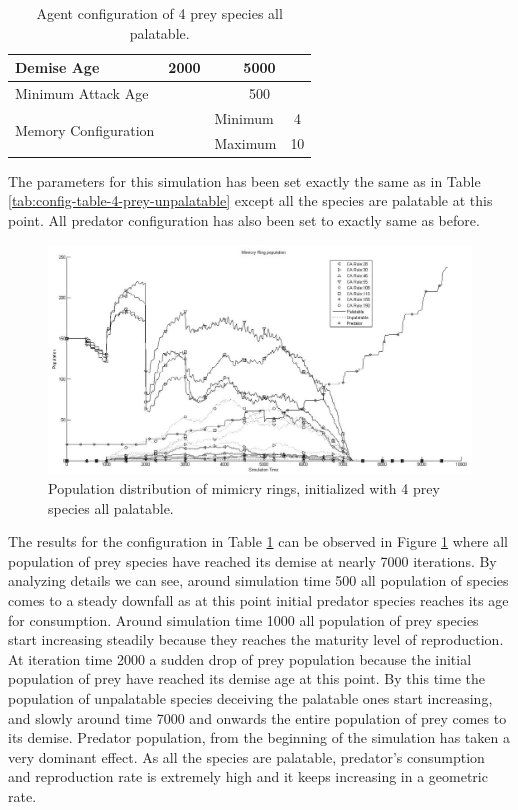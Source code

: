 \begin{table}[H]
\begin{tabular}{|l|l|c|c|l|c|}
  Demise Age	 									 & \multicolumn{3}{|c|}{2000}							& \multicolumn{2}{|c|}{5000} \\ \hline
  Minimum Attack Age						 & \multicolumn{3}{|c|}{} 						    & \multicolumn{2}{|c|}{500} \\ \hline
  \multirow{2}{*}{Memory Configuration} & \multicolumn{3}{|c|}{} 					& Minimum & 4 \\ \cline{5-6}
   																			& \multicolumn{3}{|c|}{} 					& Maximum & 10 \\ \hline  
\end{tabular}
\caption{Agent configuration of 4 prey species all palatable.}
\label{tab:config-table-4-prey-palatable}
\end{table}

The parameters for this simulation has been set exactly the same as in Table \ref{tab:config-table-4-prey-unpalatable} except all the species are palatable at this point. All predator configuration has also been set to exactly same as before.

\begin{figure}[H]
	\centering
	\includegraphics[scale=0.40]{images/simTime-9k-4Prey-p}
	\caption{Population distribution of mimicry rings, initialized with 4 prey species all palatable.}
	\label{fig:plot-4-prey-p}
\end{figure}

The results for the configuration in Table \ref{tab:config-table-4-prey-palatable} can be observed in Figure \ref{fig:plot-4-prey-p} where all population of prey species have reached its demise at nearly 7000 iterations. By analyzing details we can see, around simulation time 500 all population of species comes to a steady downfall as at this point initial predator species reaches its age for consumption. Around simulation time 1000 all population of prey species start increasing steadily because they reaches the maturity level of reproduction. At iteration time 2000 a sudden drop of prey population because the initial population of prey have reached its demise age at this point. By this time the population of unpalatable species deceiving the palatable ones start increasing, and slowly around time 7000 and onwards the entire population of prey comes to its demise. Predator population, from the beginning of the simulation has taken a very dominant effect. As all the species are palatable, predator's consumption and reproduction rate is extremely high and it keeps increasing in a geometric rate.

